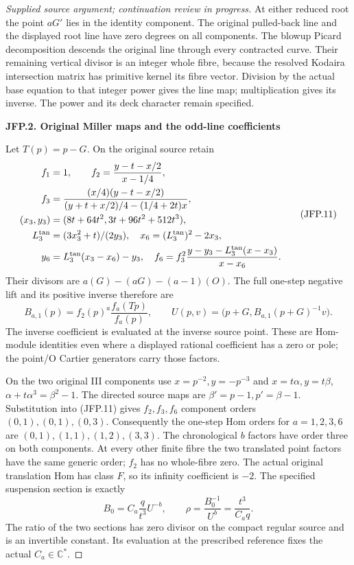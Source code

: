 \begin{proof}[Supplied source argument; continuation review in progress]
At either reduced root the point \(aG'\) lies in the identity
component. The original pulled-back line and the displayed root
line have zero degrees on all components. The blowup Picard
decomposition descends the original line through every contracted
curve. Their remaining vertical divisor is an integer whole fibre,
because the resolved Kodaira intersection matrix has primitive
kernel its fibre vector. Division by the actual base equation to
that integer power gives the line map; multiplication gives its
inverse. The power and its deck character remain specified.

\par

\medskip\noindent\textbf{JFP.2. Original Miller maps and the odd-line coefficients}

\par\nobreak

Let \(T(p)=p-G\). On the original source retain
\[
\begin{split}
 f_1&=1,\qquad f_2=\frac{y-t-x/2}{x-1/4},\\
 f_3&=\frac{(x/4)(y-t-x/2)}{(y+t+x/2)/4-(1/4+2t)x},\\
 (x_3,y_3)&=(8t+64t^2,3t+96t^2+512t^3),\\
 L_3^{\rm tan}&=(3x_3^2+t)/(2y_3),\quad
 x_6=(L_3^{\rm tan})^2-2x_3,\\
 y_6&=L_3^{\rm tan}(x_3-x_6)-y_3,\quad
 f_6=f_3^2\frac{y-y_3-L_3^{\rm tan}(x-x_3)}{x-x_6}.
\end{split}
\tag{JFP.11}
\]
Their divisors are \(a(G)-(aG)-(a-1)(O)\). The full one-step
negative lift and its positive inverse therefore are
\[
 B_{a,1}(p)=f_2(p)^a\frac{f_a(Tp)}{f_a(p)},\qquad
 U(p,v)=\bigl(p+G,B_{a,1}(p+G)^{-1}v\bigr).
\tag{JFP.12}
\]
The inverse coefficient is evaluated at the inverse source point.
These are Hom-module identities even where a displayed rational
coefficient has a zero or pole; the point/O Cartier generators
carry those factors.

On the two original III components use
\(x=p^{-2},y=-p^{-3}\) and
\(x=t\alpha,y=t\beta\),
\(\alpha+t\alpha^3=\beta^2-1\). The directed source maps are
\(\beta'=p-1,p'=\beta-1\). Substitution into (JFP.11) gives
\(f_2,f_3,f_6\) component orders \((0,1),(0,1),(0,3)\).
Consequently the one-step Hom orders for \(a=1,2,3,6\) are
\((0,1),(1,1),(1,2),(3,3)\). The chronological \(b\) factors
have order three on both components. At every other finite fibre
the two translated point factors have the same generic order;
\(f_2\) has no whole-fibre zero. The actual original translation
Hom has class \(F\), so its infinity coefficient is \(-2\).
The specified suspension section is exactly
\[
 B_0=C_a\frac q{t^3}U^{-b},\qquad
 \rho=\frac{B_0^{-1}}{U^b}=\frac{t^3}{C_aq}.
\tag{JFP.13}
\]
The ratio of the two sections has zero divisor on the compact
regular source and is an invertible constant. Its evaluation at
the prescribed reference fixes the actual \(C_a\in\mathbb C^*\).


\end{proof}
